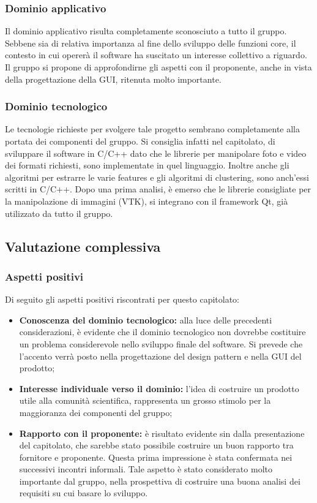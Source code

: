 \subsubsection{Dominio applicativo}
\label{dominioapp3}
Il dominio applicativo risulta completamente sconosciuto a tutto il gruppo. Sebbene sia di relativa importanza al fine dello sviluppo delle funzioni core, il contesto in cui opererà il software ha suscitato un interesse collettivo a riguardo. Il gruppo si propone di approfondirne gli aspetti con il proponente, anche in vista della progettazione della GUI\glossario{}, ritenuta molto importante. 

\subsubsection{Dominio tecnologico}
\label{dominiotec3}
Le tecnologie richieste per svolgere tale progetto sembrano completamente alla portata dei componenti del gruppo. Si consiglia infatti nel capitolato, di sviluppare il software in C/C++\glossario{} dato che le librerie per manipolare foto e video dei formati richiesti, sono implementate in quel linguaggio. Inoltre anche gli algoritmi per estrarre le varie features\glossario{} e gli algoritmi di clustering\glossario{}, sono anch'essi scritti in C/C++\glossario{}. Dopo una prima analisi, è emerso che le librerie consigliate per la manipolazione di immagini (VTK\glossario{}), si integrano con il framework\glossario{} Qt\glossario{}, già utilizzato da tutto il gruppo.

\subsection{Valutazione complessiva}
\label{valutazione3}
\subsubsection{Aspetti positivi}
\label{aspettipos3}
Di seguito gli aspetti positivi riscontrati per questo capitolato:
\begin{itemize}
\item\textbf{Conoscenza del dominio tecnologico:} alla luce delle precedenti considerazioni, è evidente che il dominio tecnologico non dovrebbe costituire un problema considerevole nello sviluppo finale del software. Si prevede che l'accento verrà posto nella progettazione del design pattern\glossario{} e nella GUI\glossario{} del prodotto;
\item\textbf{Interesse individuale verso il dominio:} l'idea di costruire un prodotto utile alla comunità scientifica, rappresenta un grosso stimolo per la maggioranza dei componenti del gruppo;
\item\textbf{Rapporto con il proponente:} è risultato evidente sin dalla presentazione del capitolato, che sarebbe stato possibile costruire un buon rapporto tra fornitore e proponente. Questa prima impressione è stata confermata nei successivi incontri informali. Tale aspetto è stato considerato molto importante dal gruppo, nella prospettiva di costruire una buona analisi dei requisiti su cui basare lo sviluppo.
\end{itemize}
